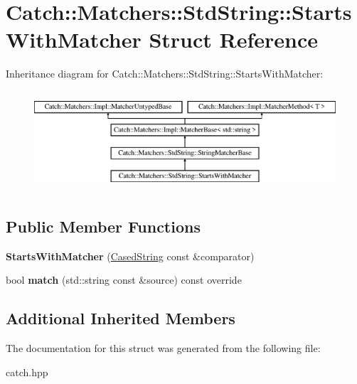 \hypertarget{structCatch_1_1Matchers_1_1StdString_1_1StartsWithMatcher}{}\section{Catch\+::Matchers\+::Std\+String\+::Starts\+With\+Matcher Struct Reference}
\label{structCatch_1_1Matchers_1_1StdString_1_1StartsWithMatcher}
Inheritance diagram for Catch\+::Matchers\+::Std\+String\+::Starts\+With\+Matcher\+:\begin{figure}[H]
\begin{center}
\leavevmode
\includegraphics[height=3.758389cm]{structCatch_1_1Matchers_1_1StdString_1_1StartsWithMatcher}
\end{center}
\end{figure}
\subsection*{Public Member Functions}
\begin{DoxyCompactItemize}
\item 
\mbox{\label{structCatch_1_1Matchers_1_1StdString_1_1StartsWithMatcher_a7b86f258bdbd131a6e7bcd94a8977325}} 
{\bfseries Starts\+With\+Matcher} (\mbox{\hyperlink{structCatch_1_1Matchers_1_1StdString_1_1CasedString}{Cased\+String}} const \&comparator)
\item 
\mbox{\label{structCatch_1_1Matchers_1_1StdString_1_1StartsWithMatcher_a7da4747aed0c48989d8be59a89e2b7fb}} 
bool {\bfseries match} (std\+::string const \&source) const override
\end{DoxyCompactItemize}
\subsection*{Additional Inherited Members}


The documentation for this struct was generated from the following file\+:\begin{DoxyCompactItemize}
\item 
catch.\+hpp\end{DoxyCompactItemize}
